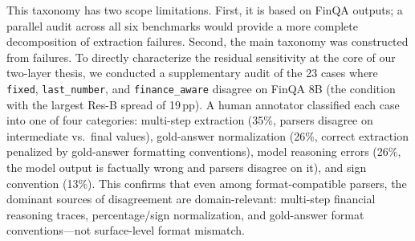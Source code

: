 This taxonomy has two scope limitations. First, it is based on FinQA outputs; a parallel audit across all six benchmarks would provide a more complete decomposition of extraction failures. Second, the main taxonomy was constructed from \numparser{} failures. To directly characterize the residual sensitivity at the core of our two-layer thesis, we conducted a supplementary audit of the 23 cases where \texttt{fixed}, \texttt{last\_number}, and \texttt{finance\_aware} disagree on FinQA 8B (the condition with the largest Res-B spread of 19\,pp). A human annotator classified each case into one of four categories: multi-step extraction (35\%, parsers disagree on intermediate vs.\ final values), gold-answer normalization (26\%, correct extraction penalized by gold-answer formatting conventions), model reasoning errors (26\%, the model output is factually wrong and parsers disagree on it), and sign convention (13\%). This confirms that even among format-compatible parsers, the dominant sources of disagreement are domain-relevant: multi-step financial reasoning traces, percentage/sign normalization, and gold-answer format conventions---not surface-level format mismatch.
